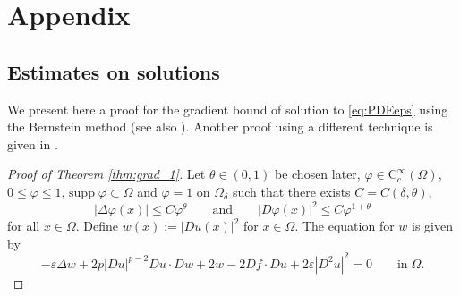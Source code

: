 \documentclass[12pt,reqno]{amsart}
\numberwithin{figure}{section}
\theoremstyle{plain}
\theoremstyle{remark}
\numberwithin{equation}{section}
\begin{document}
\section*{Appendix}
\subsection*{Estimates on solutions}
We present here a proof for the gradient bound of solution to \eqref{eq:PDEeps} using the Bernstein method (see also \cite{Lasry1989,lions_quelques_1985}). Another proof using a different technique is given in \cite{Armstrong2015a}.

\begin{proof}[Proof of Theorem \ref{thm:grad_1}] Let $\theta\in (0,1)$ be chosen later, $\varphi\in \mathrm{C}_c^\infty(\Omega)$, $0\leq \varphi\leq 1$, $\mathrm{supp}\;\varphi\subset \Omega$ and $\varphi = 1$ on $\Omega_\delta$ such that there exists $C = C(\delta,\theta)$,
\begin{equation}\label{e:ass_power}
    |\Delta \varphi(x)| \leq C\varphi^\theta \qquad\text{and}\qquad |D \varphi(x)|^2 \leq C\varphi^{1+\theta}
\end{equation}
for all $x\in \Omega$.
Define $w(x) := |Du(x)|^2$ for $x \in \Omega$. The equation for $w$ is given by
\begin{equation*}
    -\varepsilon \Delta w + 2 p|D u|^{p-2}D u \cdot D w + 2  w - 2 D f\cdot D u + 2 \varepsilon |D^2u|^2 = 0 \qquad\text{in}\;\Omega.
\end{equation*}


\end{proof}
\end{document}
